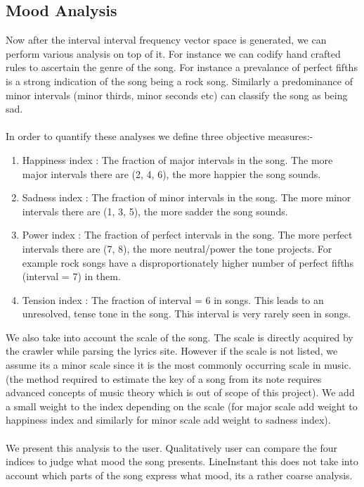 \documentclass[letterpaper, 11pt]{article}
\begin{document}
\subsection*{Mood Analysis}
Now after the interval interval frequency vector space is generated, we can perform various analysis on top of it. For instance we can codify hand crafted rules to ascertain the genre of the song. For instance a prevalance of perfect fifths is a strong indication of the song being a rock song. Similarly a predominance of minor intervals (minor thirds, minor seconds etc) can classify the song as being sad. \\\\
In order to quantify these analyses we define three objective measures:-
\begin{enumerate}
\item Happiness index : The fraction of major intervals in the song. The more major intervals there are (2, 4, 6), the more happier the song sounds. 
\item Sadness index : The fraction of minor intervals in the song. The more minor intervals there are (1, 3, 5), the more sadder the song sounds. 
\item Power index : The fraction of perfect intervals in the song. The more perfect intervals there are (7, 8), the more neutral/power the tone projects. For example rock songs have a disproportionately higher number of perfect fifths (interval = 7) in them.
\item Tension index : The fraction of interval = 6 in songs. This leads to an unresolved, tense tone in the song. This interval is very rarely seen in songs.
\end{enumerate}
We also take into account the scale of the song. The scale is directly acquired by the crawler while parsing the lyrics site. However if the scale is not listed, we assume its a minor scale since it is the most commonly occurring scale in music. (the method required to estimate the key of a song from its note requires advanced concepts of music theory which is out of scope of this project). We add a small weight to the index depending on the scale (for major scale add weight to happiness index and similarly for minor scale add weight to sadness index). \\\\
We present this analysis to the user. Qualitatively user can compare the four indices to judge what mood the song presents. LineInstant this does not take into account which parts of the song express what mood, its a rather coarse analysis.
\end{document}
